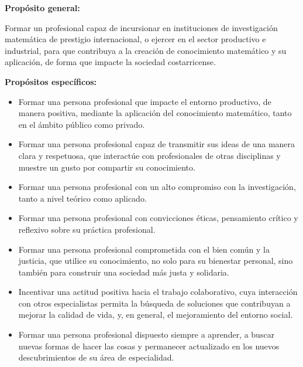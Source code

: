 \textbf{Propósito general:}

Formar un profesional capaz de incursionar en instituciones de investigación matemática de prestigio internacional, o ejercer en el sector productivo e industrial, para que contribuya a la creación de conocimiento matemático y su aplicación, de forma que impacte la sociedad costarricense.

\textbf{Propósitos específicos:} 

\begin{itemize}
    
    \color{blue} \item \color{black} Formar una persona profesional que impacte el entorno productivo, de manera positiva, mediante la aplicación del conocimiento matemático, tanto en el ámbito público como privado. 

     \color{blue} \item \color{black} Formar una persona profesional capaz de transmitir sus ideas de una manera clara y respetuosa, que interactúe con profesionales de otras disciplinas y muestre un gusto por compartir su conocimiento. 
     
    \color{blue} \item \color{black} Formar una persona profesional con un alto compromiso con la investigación, tanto a nivel teórico como aplicado.  
    
    \color{blue} \item \color{black} Formar una persona profesional con convicciones éticas, pensamiento crítico y reflexivo sobre su práctica profesional.  
    
    \color{blue} \item \color{black} Formar una persona profesional comprometida con el bien común y la justicia, que utilice su conocimiento, no solo para su bienestar personal, sino también para construir una sociedad más justa y solidaria.
    
    \color{blue} \item \color{black} Incentivar una actitud positiva hacia el trabajo colaborativo, cuya interacción con otros especialistas permita la búsqueda de soluciones que contribuyan a mejorar la calidad de vida, y, en general, el mejoramiento del entorno social. 
    
    \color{blue} \item \color{black} Formar una persona profesional dispuesto siempre a aprender, a buscar nuevas formas de hacer las cosas y permanecer actualizado en los nuevos descubrimientos de su área de especialidad.  
    \end{itemize}


